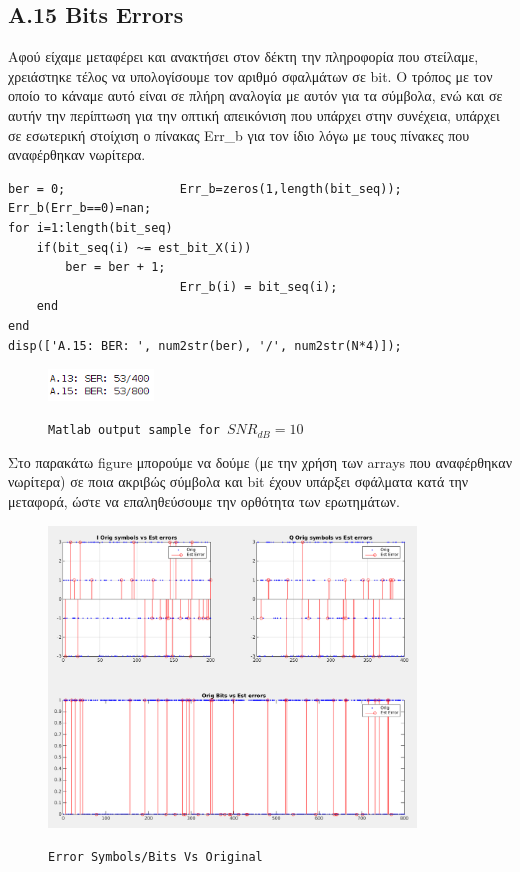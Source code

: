 \documentclass[11pt]{article}
\begin{document}
    \subsection*{A.15 Bits Errors}
    Αφού είχαμε μεταφέρει και ανακτήσει στον δέκτη την πληροφορία που στείλαμε, χρειάστηκε τέλος να υπολογίσουμε τον αριθμό σφαλμάτων σε bit.
    Ο τρόπος με τον οποίο το κάναμε αυτό είναι σε πλήρη αναλογία με αυτόν για τα σύμβολα, ενώ και σε αυτήν την περίπτωση για την οπτική απεικόνιση που υπάρχει στην συνέχεια, υπάρχει σε εσωτερική στοίχιση ο πίνακας Err\_b για τον ίδιο λόγω με τους πίνακες που αναφέρθηκαν νωρίτερα.
    
    \newpage
    \begin{lstlisting}[caption = {A.15 \texttt{Bits errors}}]
% A.15
ber = 0;                Err_b=zeros(1,length(bit_seq)); Err_b(Err_b==0)=nan;
for i=1:length(bit_seq)
    if(bit_seq(i) ~= est_bit_X(i))
        ber = ber + 1;
                        Err_b(i) = bit_seq(i); 
    end
end
disp(['A.15: BER: ', num2str(ber), '/', num2str(N*4)]); 
    \end{lstlisting}
    
    \begin{figure}[H]
        \centering
        \includegraphics[scale=0.5, width=0.25\textwidth]{img/A13_a15.png} \\
        \caption{\texttt{Matlab output sample for $SNR_{dB}=10$}}
    \end{figure}
    
    \par \noindent
    Στο παρακάτω figure μπορούμε να δούμε (με την χρήση των arrays που αναφέρθηκαν νωρίτερα) σε ποια ακριβώς σύμβολα και bit έχουν υπάρξει σφάλματα κατά την μεταφορά, ώστε να επαληθεύσουμε την ορθότητα των ερωτημάτων. 
    
    \begin{figure}[H]
        \centering
        \includegraphics[scale=0.5, width=0.87\textwidth]{img/A13_A15_errors.png} \\
        \caption{\texttt{Error Symbols/Bits Vs Original}}
    \end{figure}
    
\end{document}
